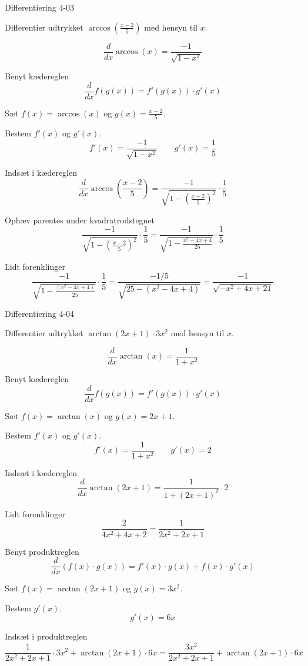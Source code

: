 \documentclass{article}
\begin{document}
\begin{exercise}{Differentiering 4-03}

Differentier udtrykket $\arccos\left( \frac{x - 2}{5} \right)$ med hensyn til $x$.


\hint
\[
\frac{d}{dx} \arccos(x) = \frac{-1}{\sqrt{1 - x^2}}
\]


\hint
Benyt kædereglen
\[
\frac{d}{dx} f(g(x)) = f'(g(x)) \cdot g'(x)
\]

\hint
Sæt $f(x) = \arccos(x)$ og $g(x) = \frac{x - 2}{5}$.

\hint
Bestem $f'(x)$ og $g'(x)$.
\[
f'(x) = \frac{-1}{\sqrt{1 - x^2}} \qquad g'(x) = \frac{1}{5}
\]

\hint
Indsæt i kædereglen
\[
\frac{d}{dx} \arccos\left( \frac{x - 2}{5} \right) = \frac{-1}{\sqrt{1 - \left( \frac{x - 2}{5} \right)^2}} \cdot \frac{1}{5}
\]

\hint
Ophæv parentes under kvadratrodstegnet
\[
\frac{-1}{\sqrt{1 - \left( \frac{x - 2}{5} \right)^2}} \cdot \frac{1}{5} = \frac{-1}{\sqrt{1 - \frac{x^2 - 4x + 4}{25}}} \cdot \frac{1}{5}
\]

\hint
Lidt forenklinger
\[
\frac{-1}{\sqrt{1 - \frac{\left( x^2 - 4x + 4 \right)}{25}}} \cdot \frac{1}{5} = \frac{-1/5}{\sqrt{25 - (x^2 - 4x + 4)}} = \frac{-1}{\sqrt{-x^2 + 4x + 21}}
\]
\end{exercise}

\begin{exercise}{Differentiering 4-04}

Differentier udtrykket $\arctan\left( 2x + 1\right) \cdot 3x^2 $ med hensyn til $x$.


\hint
\[
\frac{d}{dx} \arctan(x) = \frac{1}{1 + x^ 2}
\]


\hint
Benyt kædereglen
\[
\frac{d}{dx} f(g(x)) = f'(g(x)) \cdot g'(x)
\]

\hint
Sæt $f(x) = \arctan(x)$ og $g(x) = 2x + 1$.

\hint
Bestem $f'(x)$ og $g'(x)$.
\[
f'(x) = \frac{1}{1 + x^ 2} \qquad g'(x) = 2
\]

\hint
Indsæt i kædereglen
\[
\frac{d}{dx} \arctan\left( 2x + 1 \right) = \frac{1}{1 + \left( 2x + 1 \right)^2} \cdot 2
\]

\hint
Lidt forenklinger
\[
\frac{2}{4x^2 + 4x + 2} = \frac{1}{2x^2 + 2x + 1}
\]

\hint
Benyt produktreglen
\[
\frac{d}{dx} \left(f(x) \cdot g(x) \right) = f'(x) \cdot g(x) + f(x) \cdot g'(x)
\]

\hint
Sæt $f(x) = \arctan(2x + 1)$ og $g(x) = 3x^2$.

\hint
Bestem $g'(x)$.
\[
g'(x) = 6x
\]

\hint
Indsæt i produktreglen
\[
 \frac{1}{2x^2 + 2x + 1} \cdot 3x^2 + \arctan(2x + 1) \cdot 6x = \frac{3x^2}{2x^2 + 2x + 1} + \arctan(2x + 1) \cdot 6x
\]


\end{exercise}
\end{document}
